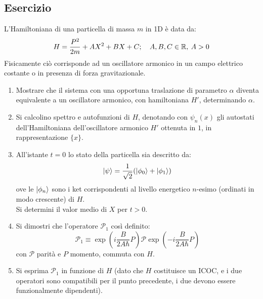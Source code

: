 \documentclass[../../FisicaTeorica.tex]{subfiles}
\begin{document}
\subsection{Esercizio \theEsercizio} 
L'Hamiltoniana di una particella di massa $m$ in 1D è data da:
\[
H=\frac{P^2}{2m} + AX^2 + BX + C; \quad A,B,C \in \mathbb{R}, \> A > 0
\]
Fisicamente ciò corrisponde ad un oscillatore armonico in un campo elettrico costante o in presenza di forza gravitazionale.
\begin{enumerate}
\item Mostrare che il sistema con una opportuna traslazione di parametro $\alpha$ diventa equivalente a un oscillatore armonico, con hamiltoniana $H'$, determinando $\alpha$.
\item Si calcolino spettro e autofunzioni di $H$, denotando con $\psi_n(x)$ gli autostati dell'Hamiltoniana dell'oscillatore armonico $H'$ ottenuta in $1$, in rappresentazione $\{x\}$.
\item All'istante $t=0$ lo stato della particella sia descritto da:
\[
\Ket{\psi}=\frac{1}{\sqrt{2}}(\Ket{\phi_0}+\Ket{\phi_1})
\]
ove le $\Ket{\phi_n}$ sono i ket corrispondenti al livello energetico $n$-esimo (ordinati in modo crescente) di $H$.\\
Si determini il valor medio di $X$ per $t>0$.
\item Si dimostri che l'operatore $\mathcal{P}_1$ così definito:
\[
\mathcal{P}_1 \equiv \exp\left(i\frac{B}{2A\hbar}P\right) \mathcal{P} \exp\left(-i\frac{B}{2A\hbar}P\right)
\]
con $\mathcal{P}$ parità e $P$ momento, commuta con $H$.
\item Si esprima $\mathcal{P}_1$ in funzione di $H$ (dato che $H$ costituisce un ICOC, e i due operatori sono compatibili per il punto precedente, i due devono essere funzionalmente dipendenti).
\end{enumerate}
\end{document}
